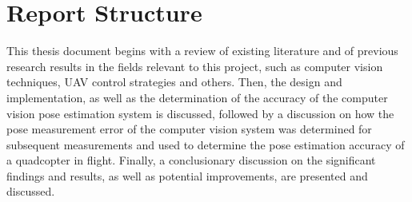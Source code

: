 \section{Report Structure}

This thesis document begins with a review of existing literature and of previous research results in the fields relevant to this project, such as computer vision techniques, UAV control strategies and others. Then, the design and implementation, as well as the determination of the accuracy of the computer vision pose estimation system is discussed, followed by a discussion on how the pose measurement error of the computer vision system was determined for subsequent measurements and used to determine the pose estimation accuracy of a quadcopter in flight. Finally, a conclusionary discussion on the significant findings and results, as well as potential improvements, are presented and discussed. 
